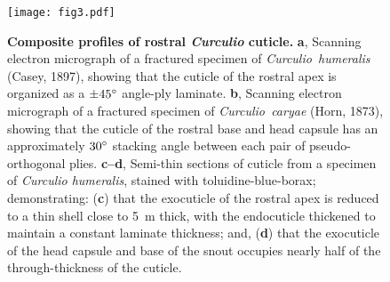 \documentclass[twocolumn, linenumbers, superscriptaddress, nofootinbib]{revtex4-1}
\begin{document}
		\begin{figure}
			\centering
			\texttt{[image: fig3.pdf]}
			\caption{\textbf{Composite profiles of rostral \textit{Curculio} cuticle.}
				\textbf{a}, Scanning electron micrograph of a fractured specimen of \textit{Curculio~humeralis} (Casey, 1897), showing that the cuticle of the rostral apex is organized as a $\pm45\degree$ angle-ply laminate.
				\textbf{b}, Scanning electron micrograph of a fractured specimen of \textit{Curculio~caryae}  (Horn, 1873), showing that the cuticle of the rostral base and head capsule has an approximately $30\degree$ stacking angle between each pair of pseudo-orthogonal plies.
				\textbf{c--d}, Semi-thin sections of cuticle from a specimen of \textit{Curculio humeralis}, stained with toluidine-blue-borax; demonstrating:
				(\textbf{c}) that the exocuticle of the rostral apex is reduced to a thin shell close to 5 \,{\textmu}m thick, with the endocuticle thickened to maintain a constant laminate thickness; and,
				(\textbf{d}) that the exocuticle of the head capsule and base of the snout occupies nearly half of the through-thickness of the cuticle.
			}
			\label{fig::profile}
		\end{figure}
		
\end{document}
